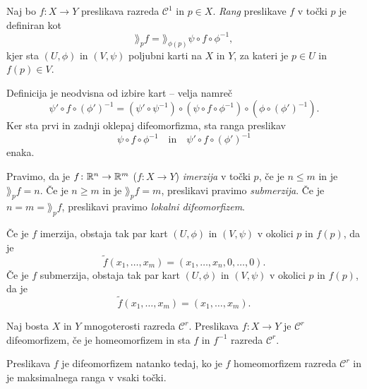 \begin{definicija}
Naj bo $f \colon X \to Y$ preslikava razreda $\mathcal{C^1}$ in
$p \in X$. \emph{Rang} preslikave $f$ v točki $p$ je definiran kot
\[
\rang_p f = \rang_{\phi(p)} \psi \circ f \circ \phi^{-1},
\]
kjer sta $(U, \phi)$ in $(V, \psi)$ poljubni karti na $X$ in $Y$,
za kateri je $p \in U$ in $f(p) \in V$.
\end{definicija}

\begin{opomba}
Definicija je neodvisna od izbire kart -- velja namreč
\[
\psi' \circ f \circ (\phi')^{-1} =
(\psi' \circ \psi^{-1}) \circ (\psi \circ
f \circ \phi^{-1}) \circ (\phi \circ (\phi')^{-1}).
\]
Ker sta prvi in zadnji oklepaj difeomorfizma, sta ranga preslikav
\[
\psi \circ f \circ \phi^{-1}
\quad \text{in} \quad
\psi' \circ f \circ (\phi')^{-1}
\]
enaka.
\end{opomba}

\begin{definicija}
Pravimo, da je $f \colon \mathbb{R}^n \to \mathbb{R}^m$ ($f \colon X \to Y$)
\emph{imerzija} v točki $p$,
če je $n \leq m$ in je $\rang_p f = n$. Če je $n \geq m$ in je
$\rang_p f = m$, preslikavi pravimo \emph{submerzija}. Če je
$n = m = \rang_p f$, preslikavi pravimo
\emph{lokalni difeomorfizem}.
\end{definicija}

\begin{opomba}
Če je $f$ imerzija, obstaja tak par kart $(U, \phi)$ in $(V, \psi)$
v okolici $p$ in $f(p)$, da je
\[
\widetilde{f}(x_1, \dots, x_m) = (x_1, \dots, x_n, 0, \dots, 0).
\]
Če je $f$ submerzija, obstaja tak par kart $(U, \phi)$ in
$(V, \psi)$ v okolici $p$ in $f(p)$, da je
\[
\widetilde{f}(x_1, \dots, x_m) = (x_1, \dots, x_m).
\]
\end{opomba}


\begin{definicija}
Naj bosta $X$ in $Y$ mnogoterosti razreda $\mathcal{C}^r$.
Preslikava $f \colon X \to Y$ je $\mathcal{C}^r$ difeomorfizem, če
je homeomorfizem in sta $f$ in $f^{-1}$ razreda $\mathcal{C}^r$.
\end{definicija}

\begin{opomba}
Preslikava $f$ je difeomorfizem natanko tedaj, ko je $f$
homeomorfizem razreda $\mathcal{C}^r$ in je maksimalnega ranga v
vsaki točki.
\end{opomba}


